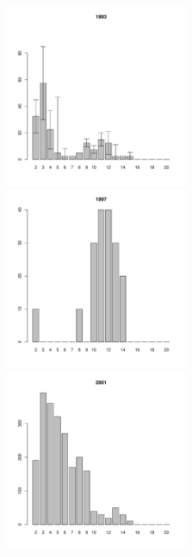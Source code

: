 \begin{figure}[hp]
\begin{minipage}[b]{.3\linewidth}
\begin{center}
	\end{center}
	\end{minipage}
	\begin{minipage}[b]{.3\linewidth}
	\begin{center}
	\includegraphics[width=60mm]{../White_Sea/Luvenga_Goreliy/midlow2_1993_.pdf}
	\end{center}
	\end{minipage}
	\hfil %
	\begin{minipage}[b]{.3\linewidth}
	\begin{center}
	\includegraphics[width=60mm]{../White_Sea/Luvenga_Goreliy/midlow2_1997_.pdf}
	\end{center}
	\end{minipage}
	\hfil %
	\begin{minipage}[b]{.3\linewidth}
	\begin{center}
	\includegraphics[width=60mm]{../White_Sea/Luvenga_Goreliy/midlow2_2001_.pdf}
	\end{center}
	\end{minipage}



\end{figure}
